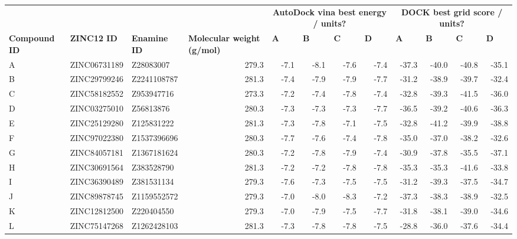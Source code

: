 \begin{sidewaystable}
\centering

\begin{small}
\begin{tabular}{lllrrrrrrrrr}
\hline
      &       &       &       & \multicolumn{4}{c}{\textbf{AutoDock vina best energy / units?}} & \multicolumn{4}{c}{\textbf{DOCK best grid score / units?}} \\
\textbf{Compound ID} & \textbf{ZINC12 ID} & \textbf{Enamine ID} & \multicolumn{1}{l}{\textbf{Molecular weight (g/mol)}} & \multicolumn{1}{l}{\textbf{A}} & \multicolumn{1}{l}{\textbf{B}} & \multicolumn{1}{l}{\textbf{C}} & \multicolumn{1}{l}{\textbf{D}} & \multicolumn{1}{l}{\textbf{A}} & \multicolumn{1}{l}{\textbf{B}} & \multicolumn{1}{l}{\textbf{C}} & \multicolumn{1}{l}{\textbf{D}} \\
\hline
A     & ZINC06731189 & Z28083007 & 279.3 & -7.1  & -8.1  & -7.6  & -7.4  & -37.3 & -40.0 & -40.8 & -35.1 \\
B     & ZINC29799246 & Z2241108787 & 281.3 & -7.4  & -7.9  & -7.9  & -7.7  & -31.2 & -38.9 & -39.7 & -32.4 \\
C     & ZINC58182552 & Z953947716  & 273.3 & -7.2  & -7.4  & -7.8  & -7.4  & -32.8 & -39.3 & -41.5 & -36.0 \\
D     & ZINC03275010 & Z56813876 & 280.3 & -7.3  & -7.3  & -7.3  & -7.7  & -36.5 & -39.2 & -40.6 & -36.3 \\
E     & ZINC25129280 & Z125831222  & 281.3 & -7.3  & -7.8  & -7.1  & -7.5  & -32.8 & -41.2 & -39.9 & -38.8 \\
F     & ZINC97022380 & Z1537396696 & 280.3 & -7.7  & -7.6  & -7.4  & -7.8  & -35.0 & -37.0 & -38.2 & -32.6 \\
G     & ZINC84057181 & Z1367181624 & 280.3 & -7.2  & -7.8  & -7.9  & -7.4  & -30.9 & -37.8 & -35.5 & -37.1 \\
H     & ZINC30691564 & Z383528790  & 281.3 & -7.2  & -7.2  & -7.8  & -7.8  & -35.3 & -35.3 & -41.6 & -33.8 \\
I     & ZINC36390489 & Z381531134  & 279.3 & -7.6  & -7.3  & -7.5  & -7.5  & -31.2 & -39.3 & -37.5 & -34.7 \\
J     & ZINC89878745 & Z1159552572 & 279.3 & -7.0  & -8.0  & -8.3  & -7.2  & -37.3 & -38.3 & -38.9 & -32.5 \\
K     & ZINC12812500 & Z220404550  & 279.3 & -7.0  & -7.9  & -7.5  & -7.7  & -31.8 & -38.1 & -39.0 & -34.6 \\
L     & ZINC75147268 & Z1262428103 & 281.3 & -7.3  & -7.8  & -7.8  & -7.5  & -28.8 & -36.0 & -37.6 & -34.4 \\

\end{tabular}
\end{small}
\end{sidewaystable}
